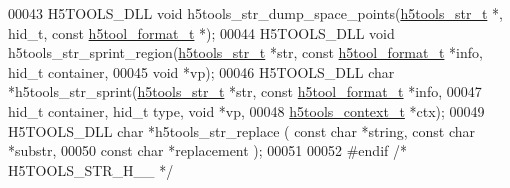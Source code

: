 \begin{DoxyCode}
00043 H5TOOLS\_DLL \textcolor{keywordtype}{void}     h5tools\_str\_dump\_space\_points(\hyperlink{structh5tools__str__t}{h5tools\_str\_t} *, hid\_t, \textcolor{keyword}{const} 
      \hyperlink{structh5tool__format__t}{h5tool\_format\_t} *);
00044 H5TOOLS\_DLL \textcolor{keywordtype}{void}     h5tools\_str\_sprint\_region(\hyperlink{structh5tools__str__t}{h5tools\_str\_t} *str, \textcolor{keyword}{const} 
      \hyperlink{structh5tool__format__t}{h5tool\_format\_t} *info, hid\_t container,
00045                                    \textcolor{keywordtype}{void} *vp);
00046 H5TOOLS\_DLL \textcolor{keywordtype}{char}    *h5tools\_str\_sprint(\hyperlink{structh5tools__str__t}{h5tools\_str\_t} *str, \textcolor{keyword}{const} 
      \hyperlink{structh5tool__format__t}{h5tool\_format\_t} *info,
00047                                    hid\_t container, hid\_t type, \textcolor{keywordtype}{void} *vp,
00048                                    \hyperlink{structh5tools__context__t}{h5tools\_context\_t} *ctx);
00049 H5TOOLS\_DLL \textcolor{keywordtype}{char}    *h5tools\_str\_replace ( \textcolor{keyword}{const} \textcolor{keywordtype}{char} *\textcolor{keywordtype}{string}, \textcolor{keyword}{const} \textcolor{keywordtype}{char} *substr, 
00050                                     \textcolor{keyword}{const} \textcolor{keywordtype}{char} *replacement );
00051 
00052 \textcolor{preprocessor}{#endif  }\textcolor{comment}{/* H5TOOLS\_STR\_H\_\_ */}\textcolor{preprocessor}{}
\end{DoxyCode}
